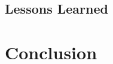 \documentclass[a4paper,12pt]{article}
\begin{document}
\subsection{Lessons Learned}

\section{Conclusion}



\end{document}
